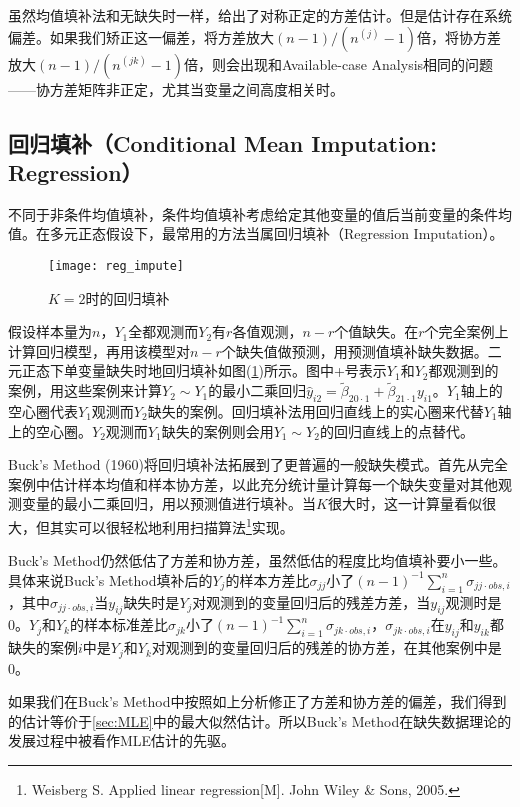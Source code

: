 \documentclass[aps,pre,12pt,preprint,onecolumn,showpacs,showkeys,AutoFakeBold]{revtex4-1}
\begin{document}
    虽然均值填补法和无缺失时一样，给出了对称正定的方差估计。但是估计存在系统偏差。如果我们矫正这一偏差，将方差放大$(n-1)/(n^{(j)}-1)$倍，将协方差放大$(n-1)/(n^{(jk)}-1)$倍，则会出现和Available-case Analysis相同的问题——协方差矩阵非正定，尤其当变量之间高度相关时。

    \subsection{回归填补（Conditional Mean Imputation: Regression）}
    不同于非条件均值填补，条件均值填补考虑给定其他变量的值后当前变量的条件均值。在多元正态假设下，最常用的方法当属回归填补（Regression Imputation）。

    \begin{figure}[ht]
    \centering
    \texttt{[image: reg\_impute]}
    \caption{\label{fig:reg_imputation}%
    $K=2$时的回归填补}
    \end{figure}

    假设样本量为$n$，$Y_1$全都观测而$Y_2$有$r$各值观测，$n-r$个值缺失。在$r$个完全案例上计算回归模型，再用该模型对$n-r$个缺失值做预测，用预测值填补缺失数据。二元正态下单变量缺失时地回归填补如图(\ref{fig:reg_imputation})所示。图中+号表示$Y_1$和$Y_2$都观测到的案例，用这些案例来计算$Y_2 \sim Y_1$的最小二乘回归$\hat y_{i2}=\tilde \beta _{20\cdot 1}+\tilde \beta _{21\cdot 1}y_{i1}$。$Y_1$轴上的空心圈代表$Y_1$观测而$Y_2$缺失的案例。回归填补法用回归直线上的实心圈来代替$Y_1$轴上的空心圈。$Y_2$观测而$Y_1$缺失的案例则会用$Y_1 \sim Y_2$的回归直线上的点替代。

    Buck's Method (1960)将回归填补法拓展到了更普遍的一般缺失模式。首先从完全案例中估计样本均值和样本协方差，以此充分统计量计算每一个缺失变量对其他观测变量的最小二乘回归，用以预测值进行填补。当$K$很大时，这一计算量看似很大，但其实可以很轻松地利用扫描算法\footnote{Weisberg S. Applied linear regression[M]. John Wiley \& Sons, 2005.}实现。

    Buck's Method仍然低估了方差和协方差，虽然低估的程度比均值填补要小一些。具体来说Buck's Method填补后的$Y_j$的样本方差比$\sigma _{jj}$小了$(n-1)^{-1}\sum _{i=1}^n \sigma _{jj\cdot obs, i}$，其中$\sigma _{jj\cdot obs, i}$当$y_{ij}$缺失时是$Y_j$对观测到的变量回归后的残差方差，当$y_{ij}$观测时是0。$Y_j$和$Y_k$的样本标准差比$\sigma _{jk}$小了$(n-1)^{-1}\sum _{i=1}^n \sigma _{jk\cdot obs, i}$，$\sigma _{jk\cdot obs, i}$在$y_{ij}$和$y_{ik}$都缺失的案例$i$中是$Y_j$和$Y_k$对观测到的变量回归后的残差的协方差，在其他案例中是0。
    
    如果我们在Buck's Method中按照如上分析修正了方差和协方差的偏差，我们得到的估计等价于\ref{sec:MLE}中的最大似然估计。所以Buck's Method在缺失数据理论的发展过程中被看作MLE估计的先驱。
\end{document}
